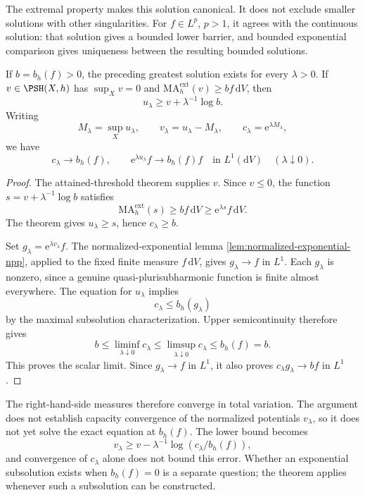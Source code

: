 The extremal property makes this solution canonical. It does not exclude smaller solutions with other singularities. For $f\in L^p$, $p>1$, it agrees with the continuous solution: that solution gives a bounded lower barrier, and bounded exponential comparison gives uniqueness between the resulting bounded solutions.

\begin{corollary}\label{cor:individual-positive-threshold-exponential}
If $b=b_h(f)>0$, the preceding greatest solution exists for every $\lambda>0$. If $v\in\PSH(X,h)$ has $\sup_Xv=0$ and
$\mathrm{MA}^{\mathrm{ext}}_h(v)\geq bf\,\mathrm{d}V$, then
\[
 u_\lambda\geq v+\lambda^{-1}\log b.
\]
Writing
\[
 M_\lambda=\sup_Xu_\lambda,\qquad
 v_\lambda=u_\lambda-M_\lambda,\qquad
 c_\lambda=\mathrm{e}^{\lambda M_\lambda},
\]
we have
\[
 c_\lambda\longrightarrow b_h(f),\qquad
 \mathrm{e}^{\lambda u_\lambda}f\longrightarrow b_h(f)f
           \quad\text{in }L^1(\mathrm{d}V)
 \quad(\lambda\downarrow0).
\]
\end{corollary}
\begin{proof}
The attained-threshold theorem supplies $v$. Since $v\leq0$, the function $s=v+\lambda^{-1}\log b$ satisfies
\[
 \mathrm{MA}^{\mathrm{ext}}_h(s)\geq bf\,\mathrm{d}V
       \geq\mathrm{e}^{\lambda s}f\,\mathrm{d}V.
\]
The theorem gives $u_\lambda\geq s$, hence $c_\lambda\geq b$.

Set $g_\lambda=\mathrm{e}^{\lambda v_\lambda}f$. The normalized-exponential lemma \cref{lem:normalized-exponential-npp}, applied to the fixed finite measure $f\,\mathrm{d}V$, gives $g_\lambda\to f$ in $L^1$. Each $g_\lambda$ is nonzero, since a genuine quasi-plurisubharmonic function is finite almost everywhere. The equation for $u_\lambda$ implies
\[
 c_\lambda\leq b_h(g_\lambda)
\]
by the maximal subsolution characterization. Upper semicontinuity therefore gives
\[
 b\leq\liminf_{\lambda\downarrow0}c_\lambda
 \leq\limsup_{\lambda\downarrow0}c_\lambda
 \leq b_h(f)=b.
\]
This proves the scalar limit. Since $g_\lambda\to f$ in $L^1$, it also proves $c_\lambda g_\lambda\to bf$ in $L^1$.
\end{proof}

The right-hand-side measures therefore converge in total variation. The argument does not establish capacity convergence of the normalized potentials $v_\lambda$, so it does not yet solve the exact equation at $b_h(f)$. The lower bound becomes
\[
 v_\lambda\geq v-\lambda^{-1}\log(c_\lambda/b_h(f)),
\]
and convergence of $c_\lambda$ alone does not bound this error. Whether an exponential subsolution exists when $b_h(f)=0$ is a separate question; the theorem applies whenever such a subsolution can be constructed.
